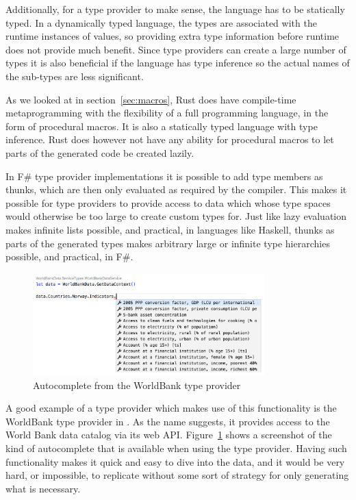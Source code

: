 Additionally, for a type provider to make sense, the language has to be statically typed. In a dynamically typed language, the types are associated with the runtime instances of values, so providing extra type information before runtime does not provide much benefit. Since type providers can create a large number of types it is also beneficial if the language has type inference so the actual names of the sub-types are less significant.

As we looked at in section~\ref{sec:macros}, Rust does have compile-time metaprogramming with the flexibility of a full programming language, in the form of procedural macros. It is also a statically typed language with type inference. Rust does however not have any ability for procedural macros to let parts of the generated code be created lazily.

In F\# type provider implementations it is possible to add type members as thunks, which are then only evaluated as required by the compiler. This makes it possible for type providers to provide access to data which whose type spaces would otherwise be too large to create custom types for. Just like lazy evaluation makes infinite lists possible, and practical, in languages like Haskell, thunks as parts of the generated types makes arbitrary large or infinite type hierarchies possible, and practical, in F\#.

\begin{figure}[ht!]
\begin{center}
\includegraphics[width=0.8\textwidth]{images/worldbank_autocomplete}
\end{center}
\hspace*{-1.5in} %
\caption{Autocomplete from the WorldBank type provider}
\label{fig:worldbank-autocomplete}
\end{figure}

A good example of a type provider which makes use of this functionality is the WorldBank type provider in \fsharpdata. As the name suggests, it provides access to the World Bank data catalog via its web API. Figure~\ref{fig:worldbank-autocomplete} shows a screenshot of the kind of autocomplete that is available when using the type provider. Having such functionality makes it quick and easy to dive into the data, and it would be very hard, or impossible, to replicate without some sort of strategy for only generating what is necessary.

